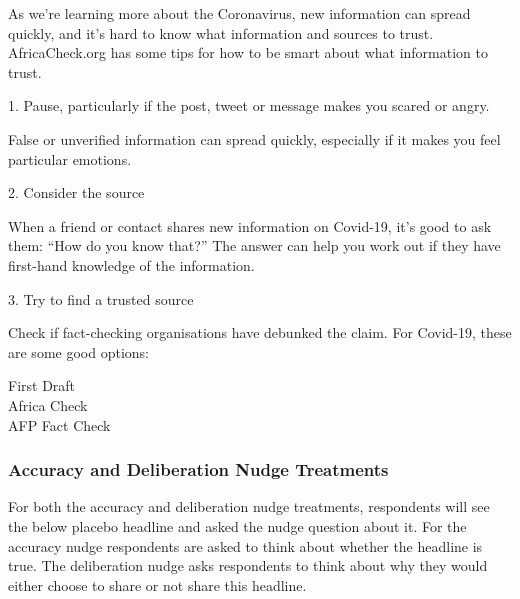 \documentclass[letterpaper, 12pt, parskip=full,DIV=10]{scrartcl}
\begin{document}
As we're learning more about the Coronavirus, new information can spread quickly, and it's hard to know what information and sources to trust. AfricaCheck.org has some tips for how to be smart about what information to trust. 

1. Pause, particularly if the post, tweet or message makes you scared or angry. 

False or unverified information can spread quickly, especially if it makes you feel particular emotions.

2. Consider the source

When a friend or contact shares new information on Covid-19, it’s good to ask them: “How do you know that?” The answer can help you work out if they have first-hand knowledge of the information.

3. Try to find a trusted source

Check if fact-checking organisations have debunked the claim. For Covid-19, these are some good options:

First Draft\\
Africa Check\\
AFP Fact Check

\subsubsection{Accuracy and Deliberation Nudge Treatments}\label{sec:nudge}

For both the accuracy and deliberation nudge treatments, respondents will see the below placebo headline and asked the nudge question about it. For the accuracy nudge respondents are asked to think about whether the headline is true. The deliberation nudge asks respondents to think about why they would either choose to share or not share this headline.
\end{document}
